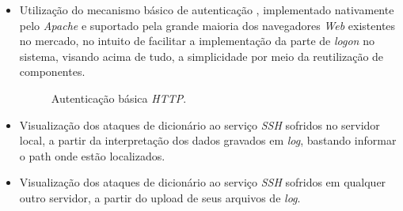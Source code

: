 \begin{itemize}
    \item Utilização do mecanismo básico de autenticação \cite{BasicAuth}, implementado nativamente pelo \textit{Apache} e suportado pela grande maioria dos navegadores \textit{Web} existentes no mercado, no intuito de facilitar a implementação da parte de \textit{logon} no sistema, visando acima de tudo, a simplicidade por meio da reutilização de componentes.

    \begin{figure}[h!tp]
        \centering
        \caption{\label{figura:crickets_http_auth} Autenticação básica \textit{HTTP}.}
    \end{figure}

    \clearpage
    \item Visualização dos ataques de dicionário ao serviço \textit{SSH} sofridos no servidor local, a partir da interpretação dos dados gravados em \textit{log}, bastando informar o path onde estão localizados.

    \item Visualização dos ataques de dicionário ao serviço \textit{SSH} sofridos em qualquer outro servidor, a partir do upload de seus arquivos de \textit{log}.


\end{itemize}
